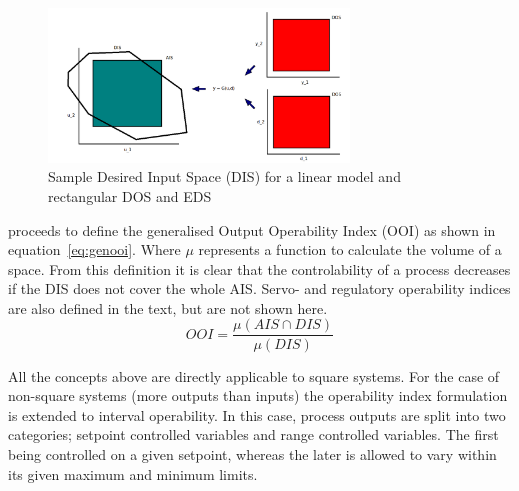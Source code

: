 \begin{figure}[htbp]
  \centering
  \includegraphics[width=8cm]{graph/sample_dis}
  \caption[Sample Desired Input Space]{Sample Desired Input Space (DIS) for
    a linear model and rectangular DOS and EDS}
  \label{fig:sampledis}
\end{figure}

\citet{vinsonphd} proceeds to define the generalised Output Operability Index (OOI) as shown in equation~\ref{eq:genooi}. 
Where $\mu$ represents a function to calculate the volume of a space.
From this definition it is clear that the controlability of a process decreases if the DIS does not cover the whole AIS. 
Servo- and regulatory operability indices are also defined in the text, but are not shown here.
\begin{equation}
  \label{eq:genooi}
     OOI = \frac{\mu(AIS\cap DIS)}{\mu(DIS)}
\end{equation}

All the concepts above are directly applicable to square systems.
For the case of non-square systems (more outputs than inputs) the operability index formulation is extended to interval operability. 
In this case, process outputs are split into two categories; setpoint controlled variables and range controlled variables.
The first being controlled on a given setpoint, whereas the later is allowed to vary within its given maximum and minimum limits.

